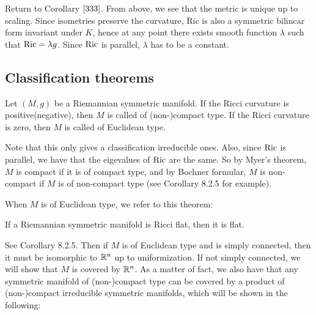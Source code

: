 \bproof
Return to Corollary $\ref{333}$. From above, we see that the
metric is unique up to scaling. Since isometries preserve the
curvature, Ric is also a symmetric bilincar form invariant under
$K$, hence at any point there exists smooth function $\lambda$
such that $\mathrm{Ric} = \lambda g$. Since $\mathrm{Ric} $ is parallel,
$\lambda$ has to be a constant.
\eproof
\subsection{Classification theorems}
\begin{definition}
	Let $(M,g)$ be a Riemannian symmetric manifold. If the Ricci
	curvature is positive(negative), then $M$ is called of
	(non-)compact type. If the Ricci curvature is zero, then $M$
	is called of Euclidean type.
\end{definition}

\bremark
Note that this only gives a classification irreducible ones.
Also, since $\mathrm{Ric}$ is parallel, we have that the eigevalues of
$\mathrm{Ric}$ are the same. So by Myer's theorem, $M$ is compact if it
is of compact type, and by Bochner formular, $M$ is non-compact
if $M$ is of non-compact type (see \cite{Peter} Corollary 8.2.5
for example).

\eremark

When $M$ is of Euclidean type, we refer to this theorem:
\begin{theorem}
	If a Riemannian symmetric manifold is Ricci flat, then it is
	flat.
\end{theorem}
\bproof
See \cite{Peter} Corollary 8.2.5.
\eproof
 Then if $M$ is of Euclidean type and  is simply connected, then
 it must be isomorphic to ${\mathbb R}^n$ up to uniformization. If not
 simply connected, we will show that $M$ is covered by ${\mathbb R}^n$.
 As a matter of fact, we also have that any symmetric manifold
 of (non-)compact type can be covered by a product of
 (non-)compact irreducible symmetric manifolds, which will be
 shown in the following:
 

